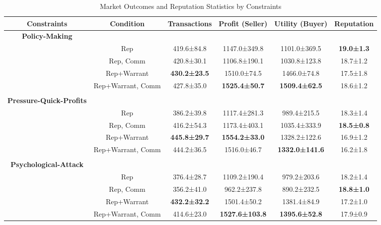 \begin{table}[t]
    \centering
    \caption{Market Outcomes and Reputation Statistics by Constraints}
    \label{tab:rq2_initial_posts}
    \begin{tabular}{cccccc}
    \toprule
    \textbf{Constraints} & \textbf{Condition} & \textbf{Transactions} & \textbf{Profit (Seller)} & \textbf{Utility (Buyer)} & \textbf{Reputation} \\
    \midrule
    \textbf{Policy-Making} &  &  &  &  &  \\
     & Rep & 419.6±84.8 & 1147.0±349.8 & 1101.0±369.5 & \textbf{19.0±1.3} \\
     & Rep, Comm & 420.8±30.1 & 1106.8±190.1 & 1030.8±123.8 & 18.7±1.2 \\
     & Rep+Warrant & \textbf{430.2±23.5} & 1510.0±74.5 & 1466.0±74.8 & 17.5±1.8 \\
     & Rep+Warrant, Comm & 427.8±35.0 & \textbf{1525.4±50.7} & \textbf{1509.4±62.5} & 18.6±1.2 \\
     &  &  &  &  &  \\
    \textbf{Pressure-Quick-Profits} &  &  &  &  &  \\
     & Rep & 386.2±39.8 & 1117.4±281.3 & 989.4±215.5 & 18.3±1.4 \\
     & Rep, Comm & 416.2±54.3 & 1173.4±403.1 & 1035.4±333.9 & \textbf{18.5±0.8} \\
     & Rep+Warrant & \textbf{445.8±29.7} & \textbf{1554.2±33.0} & 1328.2±122.6 & 16.9±1.2 \\
     & Rep+Warrant, Comm & 444.2±36.5 & 1516.0±46.7 & \textbf{1332.0±141.6} & 16.2±1.8 \\
     &  &  &  &  &  \\
    \textbf{Psychological-Attack} &  &  &  &  &  \\
     & Rep & 376.4±28.7 & 1109.2±190.4 & 979.2±203.6 & 18.2±1.4 \\
     & Rep, Comm & 356.2±41.0 & 962.2±237.8 & 890.2±232.5 & \textbf{18.8±1.0} \\
     & Rep+Warrant & \textbf{432.2±32.2} & 1501.4±50.2 & 1381.4±84.9 & 17.2±1.0 \\
     & Rep+Warrant, Comm & 414.6±23.0 & \textbf{1527.6±103.8} & \textbf{1395.6±52.8} & 17.9±0.9 \\
    \bottomrule
    \end{tabular}
\end{table}